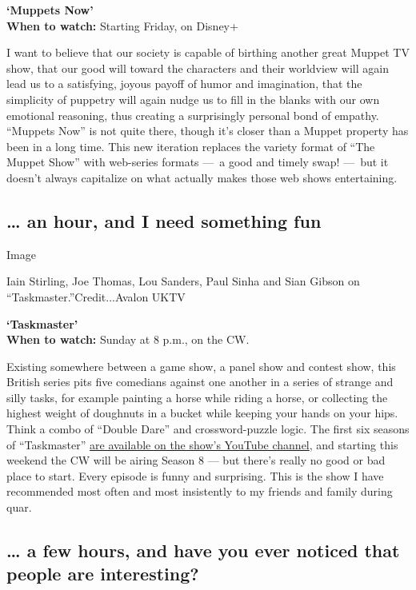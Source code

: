 \textbf{`Muppets Now'}\\
\textbf{When to watch:} Starting Friday, on Disney+

I want to believe that our society is capable of birthing another great
Muppet TV show, that our good will toward the characters and their
worldview will again lead us to a satisfying, joyous payoff of humor and
imagination, that the simplicity of puppetry will again nudge us to fill
in the blanks with our own emotional reasoning, thus creating a
surprisingly personal bond of empathy. ``Muppets Now'' is not quite
there, though it's closer than a Muppet property has been in a long
time. This new iteration replaces the variety format of ``The Muppet
Show'' with web-series formats ---~a good and timely swap! ---~but it
doesn't always capitalize on what actually makes those web shows
entertaining.

\hypertarget{-an-hour-and-i-need-something-fun}{%
\subsection{\ldots{} an hour, and I need something
fun}\label{-an-hour-and-i-need-something-fun}}

Image

Iain Stirling, Joe Thomas, Lou Sanders, Paul Sinha and Sian Gibson on
``Taskmaster.''Credit...Avalon UKTV

\textbf{`Taskmaster'}\\
\textbf{When to watch:} Sunday at 8 p.m., on the CW.

Existing somewhere between a game show, a panel show and contest show,
this British series pits five comedians against one another in a series
of strange and silly tasks, for example painting a horse while riding a
horse, or collecting the highest weight of doughnuts in a bucket while
keeping your hands on your hips. Think a combo of ``Double Dare'' and
crossword-puzzle logic. The first six seasons of ``Taskmaster''
\href{https://www.youtube.com/channel/UCT5C7yaO3RVuOgwP8JVAujQ}{are
available on the show's YouTube channel}, and starting this weekend the
CW will be airing Season 8 --- but there's really no good or bad place
to start. Every episode is funny and surprising. This is the show I have
recommended most often and most insistently to my friends and family
during quar.

\hypertarget{-a-few-hours-and-have-you-ever-noticed-that-people-are-interesting}{%
\subsection{\ldots{} a few hours, and have you ever noticed that people
are
interesting?}\label{-a-few-hours-and-have-you-ever-noticed-that-people-are-interesting}}

